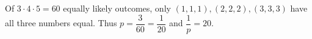 Of $3\cdot4\cdot5=60$ equally likely outcomes, only $(1,1,1),(2,2,2),(3,3,3)$ have all three numbers equal. Thus $p=\dfrac{3}{60}=\dfrac{1}{20}$ and $\boxed{\dfrac{1}{p}=20}$.
